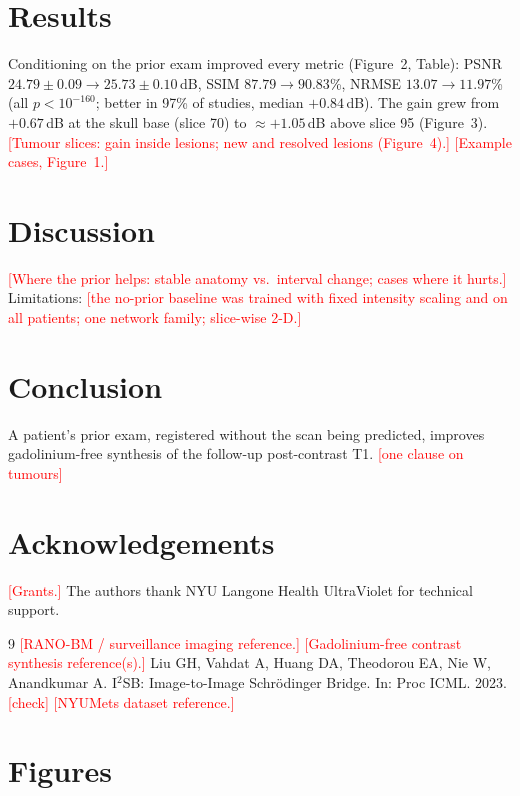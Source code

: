 \documentclass[10pt]{article}
\newcommand{\todo}[1]{\textcolor{red}{[#1]}}
\begin{document}
\section*{Results}
Conditioning on the prior exam improved every metric (Figure~2, Table): PSNR
$24.79\!\pm\!0.09\rightarrow25.73\!\pm\!0.10$\,dB, SSIM $87.79\rightarrow90.83$\%, NRMSE
$13.07\rightarrow11.97$\% (all $p<10^{-160}$; better in 97\% of studies, median $+0.84$\,dB). The
gain grew from $+0.67$\,dB at the skull base (slice 70) to $\approx+1.05$\,dB above slice 95
(Figure~3). \todo{Tumour slices: gain inside lesions; new and resolved lesions (Figure~4).}
\todo{Example cases, Figure~1.}

\section*{Discussion}
\todo{Where the prior helps: stable anatomy vs.\ interval change; cases where it hurts.}
Limitations: \todo{the no-prior baseline was trained with fixed intensity scaling and on all
patients; one network family; slice-wise 2-D.}

\section*{Conclusion}
A patient's prior exam, registered without the scan being predicted, improves gadolinium-free
synthesis of the follow-up post-contrast T1. \todo{one clause on tumours}

\section*{Acknowledgements}
\todo{Grants.} The authors thank NYU Langone Health UltraViolet for technical support.

{\small
\begin{thebibliography}{9}
 \todo{RANO-BM / surveillance imaging reference.}
 \todo{Gadolinium-free contrast synthesis reference(s).}
 Liu GH, Vahdat A, Huang DA, Theodorou EA, Nie W, Anandkumar A.
  I$^2$SB: Image-to-Image Schr\"odinger Bridge. In: Proc ICML. 2023. \todo{check}
 \todo{NYUMets dataset reference.}
\end{thebibliography}}

\clearpage
\section*{Figures}
\end{document}
